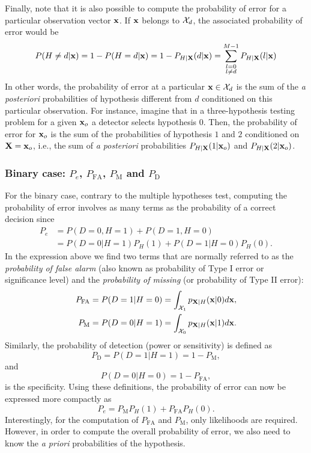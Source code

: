 Finally, note that it is also possible to compute the probability of error for a particular observation vector ${\bf x}$. If ${\bf x}$ belongs to ${\cal X}_d$, the associated probability of error would be
\begin{equation}
    P(H\neq d|{\bf x}) = 1 - P( H = d|{\bf x}) = 1 - P_{H|{\bf X}}(d|{\bf x}) = \sum_{\substack{l = 0 \\ l \neq d}}^{M-1} P_{H|{\bf X}}(l|{\bf x})
    \label{eq:Pe_x}
\end{equation}
In other words, the probability of error at a particular ${\bf x} \in {\cal X}_d$ is the sum of the {\em a posteriori} probabilities of hypothesis different from $d$ conditioned on this particular observation. For instance, imagine that in a three-hypothesis testing problem for a given ${\bf x}_o$ a detector selects hypothesis $0$. Then, the probability of error for  ${\bf x}_o$ is the sum of the probabilities of hypothesis $1$ and $2$ conditioned on ${\bf X} = {\bf x}_o$, i.e., the sum of {\em a posteriori} probabilities $P_{H|{\bf X}}(1|{\bf x}_o)$ and $P_{H|{\bf X}}(2|{\bf x}_o)$.

\subsubsection{Binary case: $P_e$, $P_\text{FA}$, $P_\text{M}$ and $P_\text{D}$}
For the binary case, contrary to the multiple hypotheses test, computing the probability of error  involves as many terms as the probability of a correct decision since
\begin{align}
    P_e & = P(D=0, H=1) + P(D=1, H=0) \nonumber \\
    & = P(D=0|H=1) P_H(1) + P(D=1|H=0) P_H(0). \nonumber
\end{align}
In the expression above we find two terms that are normally referred to as the {\em probability of false alarm} (also known as probability of Type I error or significance level) and the {\em probability of missing} (or probability of Type II error):
\begin{align}
    P_\text{FA} & = P(D=1|H=0) = \int_{{\cal X}_1} p_{{\bf X}|H}({\bf x}|0) d{\bf x}, \nonumber \\
    P_\text{M} & = P(D=0|H=1) = \int_{{\cal X}_0} p_{{\bf X}|H}({\bf x}|1) d{\bf x}. \nonumber
\end{align}
Similarly, the probability of detection (power or sensitivity) is defined as
$$P_\text{D} = P(D=1|H=1) = 1 - P_\text{M},$$
and
$$P(D=0|H=0) = 1 - P_\text{FA},$$
is the specificity. Using these definitions, the probability of error can now be expressed more compactly as
$$P_e = P_\text{M} P_H(1) + P_\text{FA} P_H(0).$$
Interestingly, for the computation of $P_\text{FA}$ and $P_\text{M}$, only likelihoods are required. However, in order to compute the overall probability of error, we also need to know the {\em a priori} probabilities of the hypothesis.

